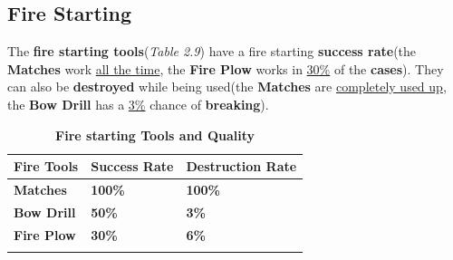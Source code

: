 		\subsection{Fire Starting}
			\par The \textbf{fire starting tools}(\textit{Table 2.9}) have a fire starting \textbf{success rate}(the \textbf{Matches} work \underline{all the time}, the \textbf{Fire Plow} works in \underline{30\%} of the \textbf{cases}). They can also be \textbf{destroyed} while being used(the \textbf{Matches} are \underline{completely used up}, the \textbf{Bow Drill} has a \underline{3\%} chance of \textbf{breaking}).
			\begin{longtable}{|C{7em}|C{7em}|C{12em}|}
			   \toprule
			   \textcolor[rgb]{ 1,  1,  1}{\textbf{Fire Tools}} & \textcolor[rgb]{ 1,  1,  1}{\textbf{Success Rate}} & \textcolor[rgb]{ 1,  1,  1}{\textbf{Destruction Rate}} \\
			    \midrule
			     \textbf{Matches} & \textbf{100\%} & \textbf{100\%} \\
			    \midrule
			     \textbf{Bow Drill} & \textbf{50\%} & \textbf{3\%} \\
			    \midrule
			     \textbf{Fire Plow} & \textbf{30\%} & \textbf{6\%} \\
			    \bottomrule	
			\caption{\textbf{\textbf{Fire} starting \textbf{Tools} and \textbf{Quality}}}
			\end{longtable}

